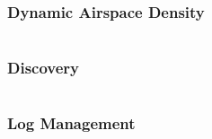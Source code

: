 \documentclass[usenames,dvipsnames,aspectratio=169,serif]{beamer}
\begin{document}
\begin{frame}
   \frametitle{Dynamic Airspace Density}
   \begin{columns}[t]
      \begin{column}{0.5\textwidth}
      \end{column}
      \begin{column}{0.5\textwidth}
      \end{column}
   \end{columns}
\end{frame}

\begin{frame}
   \frametitle{Discovery}
   \begin{columns}[t]
      \begin{column}{0.5\textwidth}
      \end{column}
      \begin{column}{0.5\textwidth}
      \end{column}
   \end{columns}
\end{frame}

\begin{frame}
   \frametitle{Log Management}
   \begin{columns}[t]
      \begin{column}{0.5\textwidth}
      \end{column}
      \begin{column}{0.5\textwidth}
      \end{column}
   \end{columns}
\end{frame}
\end{document}
